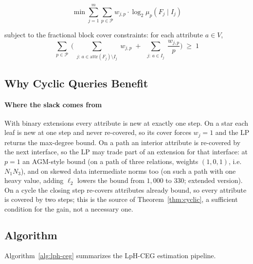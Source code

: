 \documentclass[sigconf, nonacm, acmthm=false]{acmart}
\newcommand{\block}{F}
\newcommand{\interface}{I}
\newcommand{\muLp}[3]{\mu_{#1}(#2 \mid #3)}
\newcommand{\attr}[1]{\text{attr}(#1)}
\begin{document}
\begin{equation}
\label{eq:lp}
\min \sum_{j=1}^{m} \sum_{p \in \mathcal{P}}
w_{j,p} \cdot \log_2 \muLp{p}{\block_j}{\interface_j}
\end{equation}

subject to the fractional block cover constraints: for each
attribute $a \in V$,
\begin{equation}
\label{eq:cover}
\sum_{p \in \mathcal{P}}\;\Biggl(
\sum_{\substack{j:\, a \in \attr{\block_j} \setminus \interface_j}}
\!\!\! w_{j,p}
\;+\;
\sum_{\substack{j:\, a \in \interface_j}}
\frac{w_{j,p}}{p}
\Biggr)
\;\ge\; 1
\end{equation}

\subsection{Why Cyclic Queries Benefit}\label{sec:whycyclic}

\paragraph{Where the slack comes from}
With binary extensions every attribute is new at exactly one step. On a star each leaf is new at one step and never re-covered, so its cover forces $w_j{=}1$ and the LP returns the max-degree bound. On a path an interior attribute is
re-covered by the next interface, so the LP may trade part of an
extension for that interface: at $p{=}1$ an AGM-style bound (on a path of three relations,
weights $(1,0,1)$, i.e.\ $N_1N_3$), and on skewed data intermediate norms
too (on such a path with one heavy value, adding $\ell_2$ lowers the bound
from $1{,}000$ to $330$; extended version). On a cycle the closing step re-covers attributes already bound, so
every attribute is covered by two steps; this is
the source of Theorem~\ref{thm:cyclic}, a sufficient condition for the gain, not a necessary one.

\subsection{Algorithm}

Algorithm~\ref{alg:lph-ceg} summarizes the LpH-CEG estimation pipeline.
\end{document}
